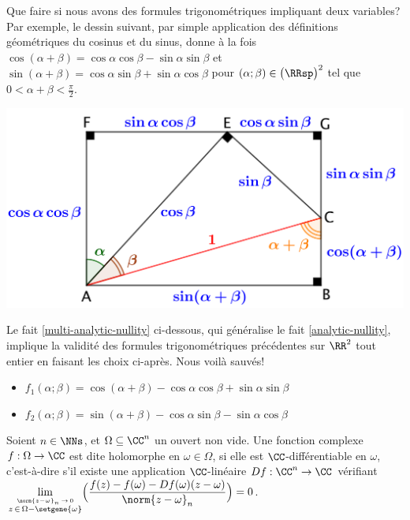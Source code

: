 Que faire si nous avons des formules trigonométriques impliquant deux variables? Par exemple, le dessin suivant, par simple application des définitions géométriques du cosinus et du sinus, donne à la fois
$\cos(\alpha + \beta) = \cos \alpha \cos \beta - \sin \alpha \sin \beta$
et
$\sin(\alpha + \beta) = \cos \alpha \sin \beta + \sin \alpha \cos \beta$
pour
$(\alpha ; \beta) \in \big( \RRsp \big)^2$ tel que $0 < \alpha + \beta < \frac{\pi}{2}$. 

\begin{center}
	\includegraphics[scale=.7]{two-var-trig-formulas.png}
\end{center}

Le fait \ref{multi-analytic-nullity} ci-dessous, qui généralise le fait \ref{analytic-nullity}, implique la validité des formules trigonométriques précédentes sur $\RR^2$ tout entier en faisant les choix ci-après.
Nous voilà sauvés!
%
\begin{itemize}[label=\small\textbullet]
	\item $f_1(\alpha ; \beta) = \cos(\alpha + \beta) - \cos \alpha \cos \beta + \sin \alpha \sin \beta$

	\item $f_2(\alpha ; \beta) = \sin(\alpha + \beta) - \cos \alpha \sin \beta - \sin \alpha \cos \beta$
\end{itemize}


\begin{defi}
    Soient $n \in \NNs$, et $\Omega \subseteq \CC^n$ un ouvert non vide.
	Une fonction complexe $f: \Omega \rightarrow \CC$ est dite holomorphe en $\omega \in \Omega$, 
	si elle est $\CC$-différentiable en $\omega$,
	c'est-à-dire s'il existe une application $\CC$-linéaire $Df: \CC^n \rightarrow \CC$
	vérifiant
	$\displaystyle \lim_{\stackrel{\norm{z - \omega}_n \, \rightarrow \, 0}{z \, \in \, \Omega - \setgene{\omega}}}\!\Big( \frac{f(z) - f(\omega) - Df(\omega) (z - \omega)}{\norm{z - \omega}_n} \Big) = 0$.
\end{defi}


